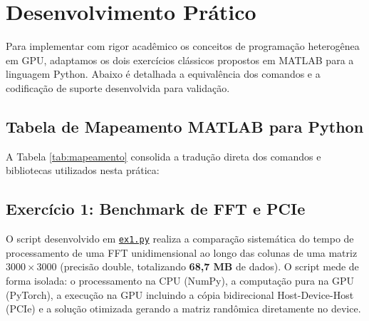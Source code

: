 \documentclass[12pt,a4paper]{article}
\begin{document}
\section{Desenvolvimento Prático}

Para implementar com rigor acadêmico os conceitos de programação heterogênea em GPU, adaptamos os dois exercícios clássicos propostos em MATLAB para a linguagem Python. Abaixo é detalhada a equivalência dos comandos e a codificação de suporte desenvolvida para validação.

\subsection{Tabela de Mapeamento MATLAB para Python}
A Tabela \ref{tab:mapeamento} consolida a tradução direta dos comandos e bibliotecas utilizados nesta prática:

\begin{table}[H]
\centering
\caption{Mapeamento dos comandos de GPU entre MATLAB e o ecossistema Python.}
\label{tab:mapeamento}
\end{table}


\subsection{Exercício 1: Benchmark de FFT e PCIe}
O script desenvolvido em \href{file:///c:/Users/mufas/OneDrive/Área de Trabalho/Faculdade/Arq_desemp/ex1.py}{\texttt{ex1.py}} realiza a comparação sistemática do tempo de processamento de uma FFT unidimensional ao longo das colunas de uma matriz $3000 \times 3000$ (precisão double, totalizando \textbf{68,7 MB} de dados). O script mede de forma isolada: o processamento na CPU (NumPy), a computação pura na GPU (PyTorch), a execução na GPU incluindo a cópia bidirecional Host-Device-Host (PCIe) e a solução otimizada gerando a matriz randômica diretamente no device.
\end{document}
